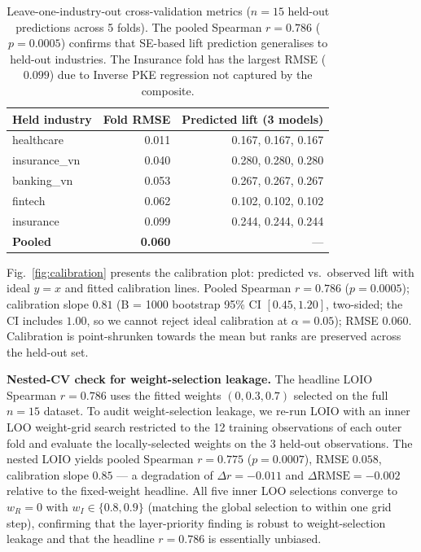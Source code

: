 \documentclass[11pt,a4paper]{article}
\begin{document}
\begin{table}[t]
\centering
\caption{Leave-one-industry-out cross-validation metrics ($n=15$ held-out
predictions across 5 folds). The pooled Spearman $r = 0.786$
($p = 0.0005$) confirms that SE-based lift prediction generalises to
held-out industries. The Insurance fold has the largest RMSE
($0.099$) due to Inverse PKE regression not captured by the composite.}
\label{tab:loio}
\small
\begin{tabular}{@{}lrr@{}}
\toprule
\textbf{Held industry} & \textbf{Fold RMSE} & \textbf{Predicted lift (3 models)} \\
\midrule
healthcare    & 0.011 & 0.167, 0.167, 0.167 \\
insurance\_vn & 0.040 & 0.280, 0.280, 0.280 \\
banking\_vn   & 0.053 & 0.267, 0.267, 0.267 \\
fintech       & 0.062 & 0.102, 0.102, 0.102 \\
insurance     & 0.099 & 0.244, 0.244, 0.244 \\
\midrule
\textbf{Pooled} & \textbf{0.060} & --- \\
\bottomrule
\end{tabular}
\end{table}

Fig.~\ref{fig:calibration} presents the calibration plot: predicted
vs.\ observed lift with ideal $y = x$ and fitted calibration lines.
Pooled Spearman $r = 0.786$ ($p = 0.0005$); calibration slope $0.81$
(B = 1000 bootstrap 95\% CI $[0.45, 1.20]$, two-sided; the CI
includes $1.00$, so we cannot reject ideal calibration at $\alpha =
0.05$); RMSE $0.060$. Calibration is point-shrunken towards the
mean but ranks are preserved across the held-out set.

\textbf{Nested-CV check for weight-selection leakage.} The headline
LOIO Spearman $r = 0.786$ uses the fitted weights $(0, 0.3, 0.7)$
selected on the full $n = 15$ dataset. To audit weight-selection
leakage, we re-run LOIO with an inner LOO weight-grid search
restricted to the 12 training observations of each outer fold and
evaluate the locally-selected weights on the 3 held-out observations.
The nested LOIO yields pooled Spearman $r = 0.775$ ($p = 0.0007$),
RMSE $0.058$, calibration slope $0.85$ --- a degradation of
$\Delta r = -0.011$ and $\Delta\mathrm{RMSE} = -0.002$ relative to
the fixed-weight headline. All five inner LOO selections converge to
$w_R = 0$ with $w_I \in \{0.8, 0.9\}$ (matching the global selection
to within one grid step), confirming that the layer-priority
finding is robust to weight-selection leakage and that the headline
$r = 0.786$ is essentially unbiased.
\end{document}
